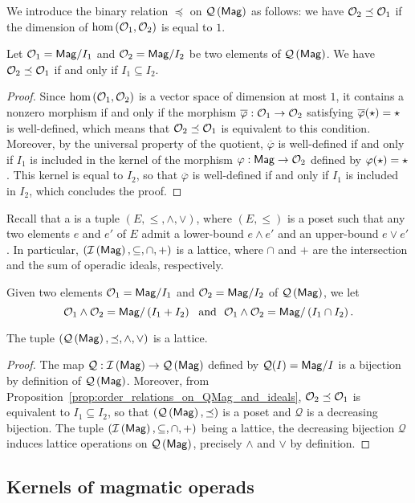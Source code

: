 We introduce the binary relation $\preceq$ on $\mathcal{Q}\left(\mathsf{Mag}\right)$ as follows: we
have $\mathcal{O}_2\preceq\mathcal{O}_1$ if the dimension of
$\text{hom}\left(\mathcal{O}_1,\mathcal{O}_2\right)$ is equal to $1$.

\begin{Proposition} \label{prop:order_relations_on_QMag_and_ideals}
  Let $\mathcal{O}_1=\mathsf{Mag}/I_1$ and $\mathcal{O}_2=\mathsf{Mag}/I_2$ be two elements of $\mathcal{Q}\left(\mathsf{Mag}\right)$.
  We have $\mathcal{O}_2\preceq\mathcal{O}_1$ if and only if $I_1\subseteq I_2$.
\end{Proposition}

\begin{proof}
  Since $\text{hom}\left(\mathcal{O}_1,\mathcal{O}_2\right)$ is a vector space of
  dimension at most $1$, it contains a nonzero morphism if and only if
  the morphism
  $\overline{\varphi}:\mathcal{O}_1\to\mathcal{O}_2$ satisfying
  $\overline{\varphi}(\operatorname{\star})=\operatorname{\star}$ is well-defined, which means
  that $\mathcal{O}_2\preceq\mathcal{O}_1$ is equivalent to this condition. Moreover,
  by the universal property of the quotient, $\overline{\varphi}$ is
  well-defined if and only if $I_1$ is included in the kernel of the
  morphism $\varphi:\mathsf{Mag}\to\mathcal{O}_2$ defined by
  $\varphi(\operatorname{\star})=\operatorname{\star}$. This kernel is equal to $I_2$, so that
  $\overline{\varphi}$ is well-defined if and only if $I_1$ is included
  in $I_2$, which concludes the proof.
\end{proof}

Recall that a  is a tuple $\left(E,\leq,\wedge,\vee\right)$,
where $\left(E,\leq\right)$ is a poset such that any two elements $e$
and $e'$ of $E$ admit a lower-bound $e\wedge e'$ and an upper-bound
$e\vee e'$. In particular, $\left(\mathcal{I}\left(\mathsf{Mag}\right),\subseteq,\cap,+\right)$ is a
lattice, where $\cap$ and $+$ are the intersection and the sum of
operadic ideals, respectively.

Given two elements $\mathcal{O}_1=\mathsf{Mag}/I_1$ and $\mathcal{O}_2=\mathsf{Mag}/I_2$ of $\mathcal{Q}\left(\mathsf{Mag}\right)$,
we let
\begin{equation} \label{equ:definition_of_lattice_operations_of_QMag}
  \mathcal{O}_1\wedge \mathcal{O}_2=\mathsf{Mag}/\left(I_1+I_2\right)\ \ \text{and}\ \
  \mathcal{O}_1\wedge \mathcal{O}_2=\mathsf{Mag}/\left(I_1\cap I_2\right).
  \end{equation}

\begin{Theorem} \label{thm:lattice_structure_of_QMag}
  The tuple $\left(\mathcal{Q}\left(\mathsf{Mag}\right),\preceq,\wedge,\vee\right)$ is a lattice.
\end{Theorem}

\begin{proof}
  The map $\mathcal{Q}:\mathcal{I}\left(\mathsf{Mag}\right)\to\mathcal{Q}\left(\mathsf{Mag}\right)$ defined by $\mathcal{Q}(I)=\mathsf{Mag}/I$
  is a bijection by definition of $\mathcal{Q}\left(\mathsf{Mag}\right)$. Moreover, from
  Proposition~\ref{prop:order_relations_on_QMag_and_ideals},
  $\mathcal{O}_2\preceq\mathcal{O}_1$ is equivalent to $I_1\subseteq I_2$, so that
  $\left(\mathcal{Q}\left(\mathsf{Mag}\right),\preceq\right)$ is a poset and $\mathcal{Q}$ is a
  decreasing bijection. The tuple $\left(\mathcal{I}\left(\mathsf{Mag}\right),\subseteq,\cap,+\right)$
  being a lattice, the decreasing bijection $\mathcal{Q}$ induces
  lattice operations on $\mathcal{Q}\left(\mathsf{Mag}\right)$, precisely $\wedge$ and $\vee$ by
  definition.
  \end{proof}
\subsection{Kernels of magmatic operads}
